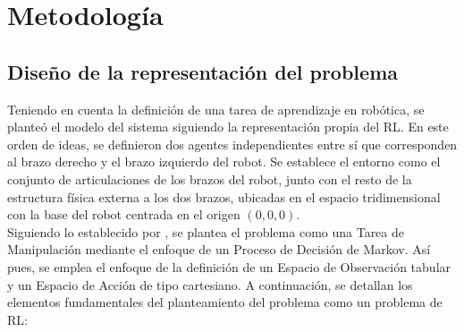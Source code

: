 \section{Metodología}

\subsection{Diseño de la representación del problema}

Teniendo en cuenta la definición de una tarea de aprendizaje en robótica, se planteó el modelo del sistema siguiendo la representación propia del RL. En este orden de ideas, se definieron dos agentes independientes entre sí que corresponden al brazo derecho y el brazo izquierdo del robot. Se establece el entorno como el conjunto de articulaciones de los brazos del robot, junto con el resto de la estructura física externa a los dos brazos, ubicadas en el espacio tridimensional con la base del robot centrada en el origen $(0,0,0)$.\\

Siguiendo lo establecido por \textcite{kroemer2021review}, se plantea el problema como una Tarea de Manipulación mediante el enfoque de un Proceso de Decisión de Markov. Así pues, se emplea el enfoque de la definición de un Espacio de Observación tabular y un Espacio de Acción de tipo cartesiano. A continuación, se detallan los elementos fundamentales del planteamiento del problema como un problema de RL:

